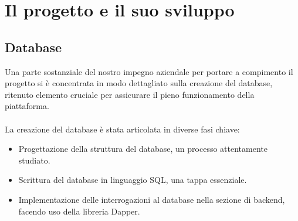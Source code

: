 \chapter{Il progetto e il suo sviluppo}\label{chapter:formattazione}

\section{Database}\label{sec:cap_sec_subsec}
Una parte sostanziale del nostro impegno aziendale per portare a compimento il 
progetto si è concentrata in modo dettagliato sulla creazione del database, ritenuto 
elemento cruciale per assicurare il pieno funzionamento della piattaforma.
\\ \\
La creazione del database è stata articolata in diverse fasi chiave:
\begin{itemize}
	\item Progettazione della struttura del database, un processo attentamente studiato.
	\item Scrittura del database in linguaggio SQL, una tappa essenziale.
	\item Implementazione delle interrogazioni al database nella sezione di backend, facendo uso della libreria Dapper.
\end{itemize}


